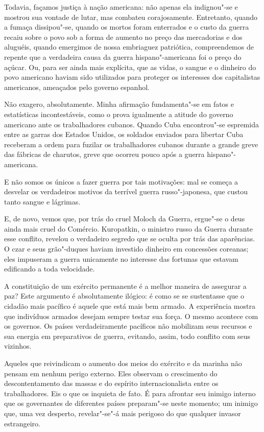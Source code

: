 Todavia, façamos justiça à nação americana: não apenas ela indignou"-se
e mostrou sua vontade de lutar, mas combateu corajosamente. Entretanto,
quando a fumaça dissipou"-se, quando os mortos foram enterrados e
o custo da guerra recaiu sobre o povo sob a forma de aumento no
preço das mercadorias e dos aluguéis, quando emergimos de nossa
embriaguez patriótica, compreendemos de repente que a verdadeira causa
da guerra hispano"-americana foi o preço do açúcar. Ou, para ser ainda
mais explícita, que as vidas, o sangue e o dinheiro do povo americano
haviam sido utilizados para proteger os interesses dos capitalistas
americanos, ameaçados pelo governo espanhol.

Não exagero, absolutamente. Minha afirmação fun\-damenta"-se em fatos e
estatísticas incontestáveis, como o prova igualmente a atitude do
governo americano ante os trabalhadores cubanos. Quando Cuba
encontrou"-se espremida entre as garras dos Estados Unidos, os
soldados enviados para libertar Cuba receberam a ordem para fuzilar os
trabalhadores cubanos durante a grande greve das fábricas de charutos,		\EP[.6]
greve que ocorreu pouco após a guerra hispano"-americana.

E não somos os únicos a fazer guerra por tais motivações: mal se
começa a desvelar os verdadeiros motivos da terrível guerra
russo"-japonesa, que custou tanto sangue e lágrimas.

E, de novo, vemos que, por trás do cruel Moloch da Guerra, ergue"-se o
deus ainda mais cruel do Comércio. Kuropatkin, o ministro russo da
Guerra durante esse conflito, revelou o verdadeiro segredo que se
oculta por trás das aparências. O czar e seus grão"-duques haviam
investido dinheiro em concessões coreanas; eles impuseram a guerra
unicamente no interesse das fortunas que estavam edificando a toda
velocidade.

A constituição de um exército permanente é a melhor maneira de assegurar
a paz? Este argumento é absolutamente ilógico: é como se se sustentasse
que o cidadão mais pacífico é aquele que está mais bem armado. A
experiência mostra que indivíduos armados desejam sempre testar sua
força. O mesmo acontece com os governos. Os países verdadeiramente
pacíficos não mobilizam seus recursos e sua energia em preparativos de
guerra, evitando, assim, todo conflito com seus vizinhos.

Aqueles que reivindicam o aumento dos meios do exército e da marinha não
pensam em nenhum perigo externo. Eles observam o crescimento do
descontentamento das massas e do espírito internacionalista entre os
trabalhadores. Eis o que os inquieta de fato. É para afrontar seu
inimigo interno que os governantes de diferentes países preparam"-se
neste momento; um inimigo que, uma vez desperto, revelar"-se"-á mais
perigoso do que qualquer invasor estrangeiro.

